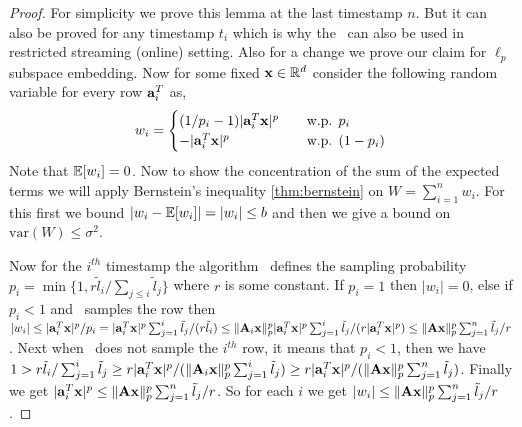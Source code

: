 % 
\begin{proof}{\label{proof:slowOnlineGuarantee}}
 For simplicity we prove this lemma at the last timestamp $n$. But it can also be proved for any timestamp $t_{i}$ which is why the ~can also be used in restricted streaming (online) setting. Also for a change we prove our claim for $\ell_{p}$ subspace embedding. Now for some fixed $\*x \in \~R^{d}$ consider the following random variable for every row $\*a_i^{T}$ as,
\[ w_{i} =
  \begin{cases}
    (1/p_{i}-1)|\*a_{i}^{T}\*x|^{p}  & \quad \text{w.p. } p_{i} \\
    -|\*a_{i}^{T}\*x|^{p} & \quad \text{w.p. } (1-p_{i})
  \end{cases}
\]
% 
 Note that $\~E[w_{i}] = 0$. Now to show the concentration of the sum of the expected terms we will apply Bernstein's inequality \ref{thm:bernstein} on $W = \sum_{i=1}^{n} w_{i}$. For this first we bound $|w_{i} - \~E[w_{i}]| = |w_{i}| \leq b$ and then we give a bound on $\mbox{var}(W) \leq \sigma^{2}$. 

 Now for the $i^{th}$ timestamp the algorithm ~defines the sampling probability $p_{i} = \min\{1,r\tilde{l}_{i}/\sum_{j \leq i}\tilde{l}_{j}\}$ where $r$ is some constant. If $p_{i}=1$ then $|w_{i}| = 0$, else if $p_{i} <1$ and ~samples the row then $|w_{i}| \leq |\*a_{i}^{T}\*x|^{p}/p_{i} = |\*a_{i}^{T}\*x|^{p}\sum_{j=1}^{i}\tilde{l}_{j}/(r\tilde{l}_{i}) \leq \|\*A_{i}\*x\|_{p}^{p}|\*a_{i}^{T}\*x|^{p}\sum_{j=1}^{i}\tilde{l}_{j}/(r|\*a_{i}^{T}\*x|^{p}) \leq  \|\*A\*x\|_{p}^{p}\sum_{j=1}^{n}\tilde{l}_{j}/r$. Next when ~does not sample the $i^{th}$ row, it means that $p_{i} < 1$, then we have $1 > r\tilde{l}_{i}/\sum_{j=1}^{i}\tilde{l}_{j} \geq r|\*a_{i}^{T}\*x|^{p}/(\|\*A_{i}\*x\|_{p}^{p}\sum_{j=1}^{i}\tilde{l}_{j}) \geq r|\*a_{i}^{T}\*x|^{p}/(\|\*A\*x\|_{p}^{p}\sum_{j=1}^{n}\tilde{l}_{j})$. Finally we get $|\*a_{i}^{T}\*x|^{p} \leq \|\*A\*x\|_{p}^{p}\sum_{j=1}^{n}\tilde{l}_{j}/r$. So for each $i$ we get $|w_{i}| \leq \|\*A\*x\|_{p}^{p}\sum_{j=1}^{n}\tilde{l}_{j}/r$. 


\end{proof}
